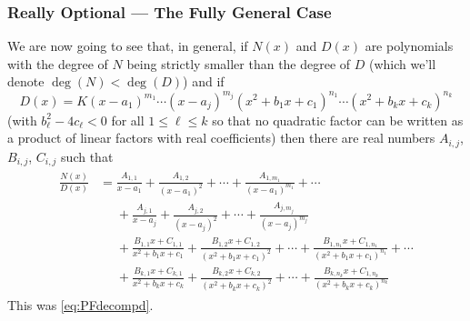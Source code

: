 \subsubsection*{Really Optional --- The Fully General Case}
We are now going to see that, in general, if $N(x)$ and $D(x)$ are polynomials
with the degree of $N$ being strictly smaller than the degree of $D$
(which we'll denote $\deg(N)<\deg(D)$) and if 
\begin{equation*}
D(x)=K(x-a_1)^{m_1}\cdots(x-a_j)^{m_j}
(x^2+b_1x+c_1)^{n_1}\cdots(x^2+b_kx+c_k)^{n_k}
\tag{E1}
\end{equation*}
(with $b_\ell^2-4 c_\ell<0$ for all $1\le\ell\le k$ so that no 
quadratic factor can be written as a product of linear factors with real coefficients) then there are real numbers $A_{i,j}$, $B_{i,j}$, $C_{i,j}$
such that 
\begin{align*}
\begin{split}
\frac{N(x)}{D(x)}
&=\frac{A_{1,1}}{x-a_1}+\frac{A_{1,2}}{(x-a_1)^2}+\cdots
          +\frac{A_{1,m_1}}{(x-a_1)^{m_1}}+\cdots\\
&\phantom{=}\!+\frac{A_{j,1}}{x-a_j}+\frac{A_{j,2}}{(x-a_j)^2}+\cdots
          +\frac{A_{j,m_j}}{(x-a_j)^{m_j}}\\
&\phantom{=}\!+\frac{B_{1,1}x+C_{1,1}}{x^2+b_1x+c_1}
          +\frac{B_{1,2}x+C_{1,2}}{(x^2+b_1x+c_1)^2}+\!\cdots\!
          +\frac{B_{1,n_1}x+C_{1,n_1}}{(x^2+b_1x+c_1)^{n_1}}\!+\!\cdots\\
&\phantom{=}\!+\frac{B_{k,1}x+C_{k,1}}{x^2+b_kx+c_k}
          +\frac{B_{k,2}x+C_{k,2}}{(x^2+b_kx+c_k)^2}+\!\cdots\!
          +\frac{B_{k,n_k}x+C_{1,n_k}}{(x^2+b_kx+c_k)^{n_k}}
\end{split}
\end{align*}
This was \eqref{eq:PFdecompd}.

